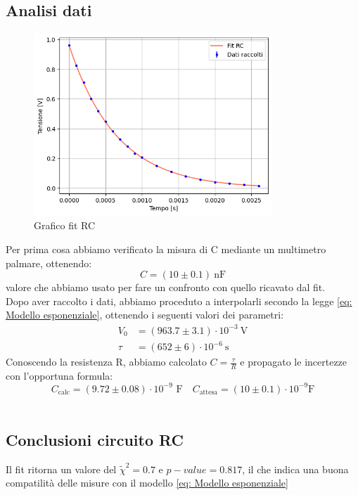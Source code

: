 \documentclass[letterpaper,12pt]{article}
\begin{document}
\subsection{Analisi dati}
\begin{figure}[h] 
  \centering
  \includegraphics[width=0.8\textwidth]{RC.png} %
  \caption{Grafico fit RC}
  \label{fig:fitRC}
\end{figure}
Per prima cosa abbiamo verificato la  misura  di C mediante un multimetro palmare, ottenendo: $$ C = (10 \pm 0.1)\ \text{nF}$$  valore che abbiamo usato per fare un confronto con quello ricavato dal fit.\\
Dopo aver raccolto i dati, abbiamo proceduto a interpolarli secondo la legge \eqref{eq: Modello esponenziale}, ottenendo i seguenti valori dei parametri:
\begin{align*}
    V_0 &= (963.7 \pm 3.1)\cdot 10^{-3}\ \text{V} \\
    \tau &= (652 \pm 6) \cdot 10^{-6}\ \text{s}
\end{align*}
Conoscendo la resistenza R, abbiamo calcolato $C = \frac{\tau}{R}$ e propagato le incertezze con l'opportuna formula:
$$ C_\text{calc}= (9.72 \pm 0.08) \cdot 10^{-9} \text{ F} \quad
C_\text{attesa}= (10 \pm 0.1) \cdot 10^{-9} \text{F}
$$ \\


\subsection{Conclusioni circuito RC}
Il fit ritorna un valore del $\widetilde{\chi}^2 = 0.7$ e $p-value = 0.817$, il che indica una buona compatilità delle misure con il modello \eqref{eq: Modello esponenziale}\\
\end{document}
